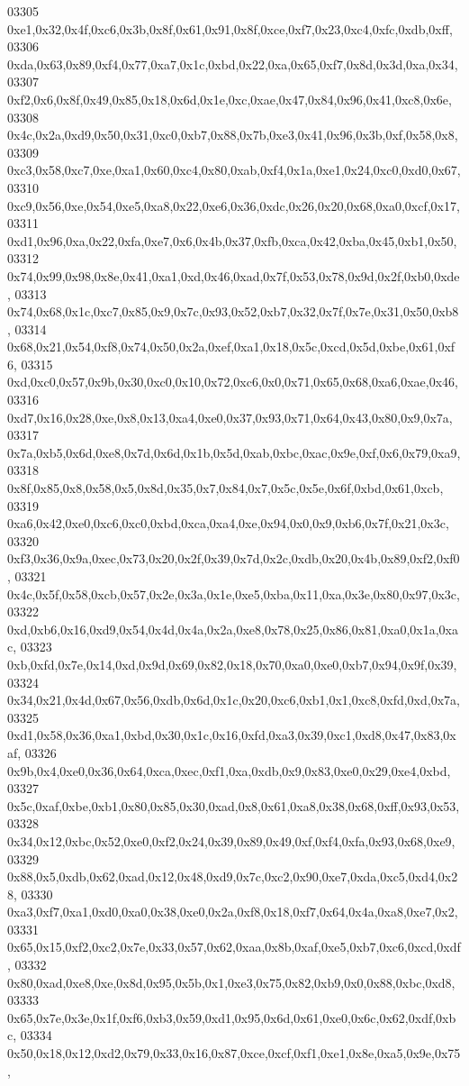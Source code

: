 \begin{DoxyCode}
03305   0xe1,0x32,0x4f,0xc6,0x3b,0x8f,0x61,0x91,0x8f,0xce,0xf7,0x23,0xc4,0xfc,0xdb,0xff,
03306   0xda,0x63,0x89,0xf4,0x77,0xa7,0x1c,0xbd,0x22,0xa,0x65,0xf7,0x8d,0x3d,0xa,0x34,
03307   0xf2,0x6,0x8f,0x49,0x85,0x18,0x6d,0x1e,0xc,0xae,0x47,0x84,0x96,0x41,0xc8,0x6e,
03308   0x4c,0x2a,0xd9,0x50,0x31,0xc0,0xb7,0x88,0x7b,0xe3,0x41,0x96,0x3b,0xf,0x58,0x8,
03309   0xc3,0x58,0xc7,0xe,0xa1,0x60,0xc4,0x80,0xab,0xf4,0x1a,0xe1,0x24,0xc0,0xd0,0x67,
03310   0xc9,0x56,0xe,0x54,0xe5,0xa8,0x22,0xe6,0x36,0xdc,0x26,0x20,0x68,0xa0,0xcf,0x17,
03311   0xd1,0x96,0xa,0x22,0xfa,0xe7,0x6,0x4b,0x37,0xfb,0xca,0x42,0xba,0x45,0xb1,0x50,
03312   0x74,0x99,0x98,0x8e,0x41,0xa1,0xd,0x46,0xad,0x7f,0x53,0x78,0x9d,0x2f,0xb0,0xde,
03313   0x74,0x68,0x1c,0xc7,0x85,0x9,0x7c,0x93,0x52,0xb7,0x32,0x7f,0x7e,0x31,0x50,0xb8,
03314   0x68,0x21,0x54,0xf8,0x74,0x50,0x2a,0xef,0xa1,0x18,0x5c,0xcd,0x5d,0xbe,0x61,0xf6,
03315   0xd,0xc0,0x57,0x9b,0x30,0xc0,0x10,0x72,0xc6,0x0,0x71,0x65,0x68,0xa6,0xae,0x46,
03316   0xd7,0x16,0x28,0xe,0x8,0x13,0xa4,0xe0,0x37,0x93,0x71,0x64,0x43,0x80,0x9,0x7a,
03317   0x7a,0xb5,0x6d,0xe8,0x7d,0x6d,0x1b,0x5d,0xab,0xbc,0xac,0x9e,0xf,0x6,0x79,0xa9,
03318   0x8f,0x85,0x8,0x58,0x5,0x8d,0x35,0x7,0x84,0x7,0x5c,0x5e,0x6f,0xbd,0x61,0xcb,
03319   0xa6,0x42,0xe0,0xc6,0xc0,0xbd,0xca,0xa4,0xe,0x94,0x0,0x9,0xb6,0x7f,0x21,0x3c,
03320   0xf3,0x36,0x9a,0xec,0x73,0x20,0x2f,0x39,0x7d,0x2c,0xdb,0x20,0x4b,0x89,0xf2,0xf0,
03321   0x4c,0x5f,0x58,0xcb,0x57,0x2e,0x3a,0x1e,0xe5,0xba,0x11,0xa,0x3e,0x80,0x97,0x3c,
03322   0xd,0xb6,0x16,0xd9,0x54,0x4d,0x4a,0x2a,0xe8,0x78,0x25,0x86,0x81,0xa0,0x1a,0xac,
03323   0xb,0xfd,0x7e,0x14,0xd,0x9d,0x69,0x82,0x18,0x70,0xa0,0xe0,0xb7,0x94,0x9f,0x39,
03324   0x34,0x21,0x4d,0x67,0x56,0xdb,0x6d,0x1c,0x20,0xc6,0xb1,0x1,0xc8,0xfd,0xd,0x7a,
03325   0xd1,0x58,0x36,0xa1,0xbd,0x30,0x1c,0x16,0xfd,0xa3,0x39,0xc1,0xd8,0x47,0x83,0xaf,
03326   0x9b,0x4,0xe0,0x36,0x64,0xca,0xec,0xf1,0xa,0xdb,0x9,0x83,0xe0,0x29,0xe4,0xbd,
03327   0x5c,0xaf,0xbe,0xb1,0x80,0x85,0x30,0xad,0x8,0x61,0xa8,0x38,0x68,0xff,0x93,0x53,
03328   0x34,0x12,0xbc,0x52,0xe0,0xf2,0x24,0x39,0x89,0x49,0xf,0xf4,0xfa,0x93,0x68,0xe9,
03329   0x88,0x5,0xdb,0x62,0xad,0x12,0x48,0xd9,0x7c,0xc2,0x90,0xe7,0xda,0xc5,0xd4,0x28,
03330   0xa3,0xf7,0xa1,0xd0,0xa0,0x38,0xe0,0x2a,0xf8,0x18,0xf7,0x64,0x4a,0xa8,0xe7,0x2,
03331   0x65,0x15,0xf2,0xc2,0x7e,0x33,0x57,0x62,0xaa,0x8b,0xaf,0xe5,0xb7,0xc6,0xcd,0xdf,
03332   0x80,0xad,0xe8,0xe,0x8d,0x95,0x5b,0x1,0xe3,0x75,0x82,0xb9,0x0,0x88,0xbc,0xd8,
03333   0x65,0x7e,0x3e,0x1f,0xf6,0xb3,0x59,0xd1,0x95,0x6d,0x61,0xe0,0x6c,0x62,0xdf,0xbc,
03334   0x50,0x18,0x12,0xd2,0x79,0x33,0x16,0x87,0xce,0xcf,0xf1,0xe1,0x8e,0xa5,0x9e,0x75,

\end{DoxyCode}
